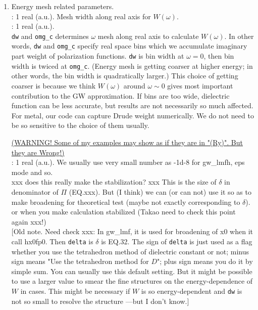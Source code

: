 \documentclass[a4paper,10pt,epsf,fleqn]{article}
\newcommand{\keyw}[1]{\fbox{\tt #1}}
\begin{document}
{\begin{enumerate}
\item 
Energy mesh related parameters.\\
\keyw{dw}     : 1 real (a.u.). Mesh width along real axis for $W(\omega)$.\\
\keyw{omg\_c} : 1 real (a.u.). \\
{\tt dw} and {\tt omg\_c}
determines $\omega$ mesh along real axis to calculate $W(\omega)$.
In other words, \verb+dw+ and \verb+omg_c+ specify real 
space bins which we accumulate imaginary part
weight of polarization functions. \verb+dw+ is bin width at
$\omega=0$, then bin width is twiced at \verb+omg_c+.
(Energy mesh is getting coarser at higher energy; in other words, 
the bin width is quadratically larger.)
This choice of getting coarser is because we think $W(\omega)$
around $\omega \sim 0$ gives most important contribution to the GW approximation.
If bins are too wide, dielectric function can be less accurate, 
but results are not necessarily so much affected. 
For metal, our code can capture Drude weight
numerically. We do not need to be so sensitive to the choice of
them usually.


\underline{(WARNING! Some of my examples may show as if they are in "(Ry)". But they are Wrong!)}\\


\vspace{2mm}
\keyw{delta}: 1 real (a.u.). We usually use very small number as -1d-8
for gw\_lmfh, eps mode and so.\\
xxx does this really make the stabilization? xxx
This is the size of $\delta$ in denominator of $\Pi$ (EQ.xxx).
But (I think) we can (or can not) use it so as to make broadening 
for theoretical test (maybe not exactly corresponding to $\delta$).
or when you make calculation stabilized 
(Takao need to check this point again xxx!) \\

[Old note. Need check xxx:
In gw\_lmf, it is used for broadening of x0 when it call hx0fp0.
Then {\tt delta} is $\delta$ is EQ.32.
The sign of {\tt delta} is just used as a flag whether you use the
tetrahedron method of dielectric constant \cite{rath75} or not; minus sign means
"Use the tetrahedron method for $D$"; plus sign means you do it by simple sum.
You can usually use this default setting. But it might be possible
to use a larger value to smear the fine structures
on the energy-dependence of $W$ in cases.
This might be necessary if $W$ is so energy-dependent 
and \verb#dw# is not so small to resolve the structure
---but I don't know.]\\



\end{enumerate}}
\end{document}
